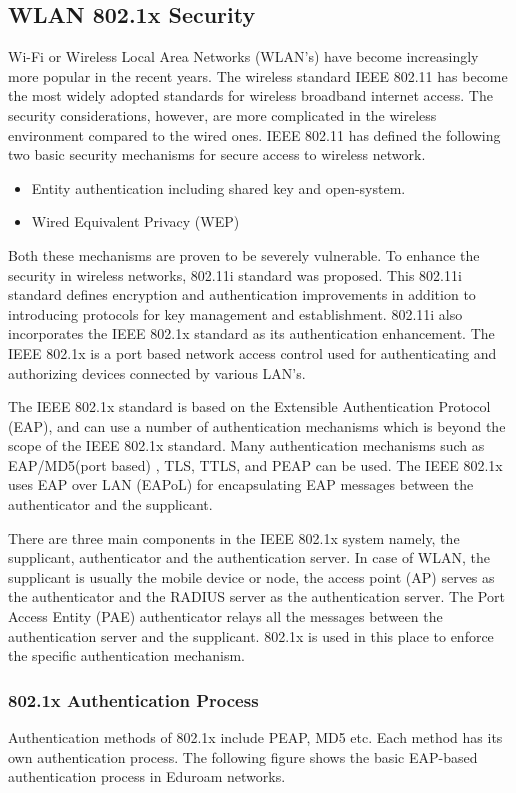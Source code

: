 \subsection{WLAN 802.1x Security \cite{WLAN_802.1x}} \label{802.1x}
Wi-Fi or Wireless Local Area Networks (WLAN’s) have become increasingly more popular in the recent years. The wireless standard IEEE 802.11 has become the most widely adopted standards for wireless broadband internet access. The security considerations, however, are more complicated in the wireless environment compared to the wired ones. IEEE 802.11 has defined the following two basic security mechanisms for secure access to wireless network.
\begin{itemize}
	\item Entity authentication including shared key and open-system.
	\item Wired Equivalent Privacy (WEP)
\end{itemize}
Both these mechanisms are proven to be severely vulnerable. To enhance the security in wireless networks, 802.11i standard was proposed. This 802.11i standard defines encryption and authentication improvements in addition to introducing protocols for key management and establishment. 802.11i also incorporates the IEEE 802.1x standard as its authentication enhancement. The IEEE 802.1x is a port based network access control used for authenticating and authorizing devices connected by various LAN’s.

The IEEE 802.1x standard is based on the Extensible Authentication Protocol (EAP), and can use a number of authentication mechanisms which is beyond the scope of the IEEE 802.1x standard. Many authentication mechanisms such as EAP/MD5(port based) , TLS, TTLS, and PEAP can be used. The IEEE 802.1x uses EAP over LAN (EAPoL) for encapsulating EAP messages between the authenticator and the supplicant. 

There are three main components in the IEEE 802.1x system namely, the supplicant, authenticator and the authentication server. In case of WLAN, the supplicant is usually the mobile device or node, the access point (AP) serves as the authenticator and the RADIUS server as the authentication server.  The Port Access Entity (PAE) authenticator relays all the messages between the authentication server and the supplicant. 802.1x is used in this place to enforce the specific authentication mechanism. 

\subsubsection{802.1x Authentication Process} \label{WLAN_802.1x_auth}
Authentication methods of 802.1x include PEAP, MD5 etc. Each method has its own authentication process. The following figure shows the basic EAP-based authentication process in Eduroam networks. 

